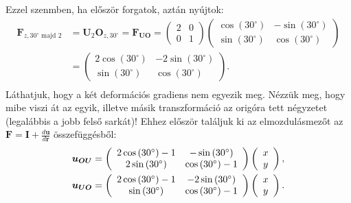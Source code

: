 \documentclass[12pt,a4paper]{scrartcl}
\let\mathbf\bm
\begin{document}
Ezzel szenmben, ha először forgatok, aztán nyújtok:
\[\begin{aligned}
  {{\mathbf{F}}_{z,30^\circ {\text{ majd 2}}}} &  = {{\mathbf{U}}_2}{{\mathbf{O}}_{z,30^\circ }} = {{\mathbf{F}}_{{\mathbf{UO}}}} = \left( {\begin{array}{*{20}{c}}
  2&0 \\ 
  0&1 
\end{array}} \right)\left( {\begin{array}{*{20}{c}}
  {\cos \left( {30^\circ } \right)}&{ - \sin \left( {30^\circ } \right)} \\ 
  {\sin \left( {30^\circ } \right)}&{\cos \left( {30^\circ } \right)} 
\end{array}} \right) \\ 
   &  = \left( {\begin{array}{*{20}{c}}
  {2\cos \left( {30^\circ } \right)}&{ - 2\sin \left( {30^\circ } \right)} \\ 
  {\sin \left( {30^\circ } \right)}&{\cos \left( {30^\circ } \right)} 
\end{array}} \right). \\ 
\end{aligned} \]
Láthatjuk, hogy a két deformációs gradiens nem egyezik meg. Nézzük meg, hogy mibe viszi át az egyik, illetve másik transzformáció az  origóra tett négyzetet (legalábbis a jobb felső sarkát)! Ehhez először találjuk ki az elmozdulásmezőt az ${\mathbf{F}} = {\mathbf{I}} + \frac{{d{\mathbf{u}}}}{{d{\mathbf{r}}}}$ összefüggésből:
 \[\begin{gathered}
  {{\mathbf{u}}_{{\mathbf{OU}}}} = \left( {\begin{array}{*{20}{c}}
  {2\cos \left( {30^\circ } \right) - 1}&{ - \sin \left( {30^\circ } \right)} \\ 
  {2\sin \left( {30^\circ } \right)}&{\cos \left( {30^\circ } \right) - 1} 
\end{array}} \right)\left( {\begin{array}{*{20}{c}}
  x \\ 
  y 
\end{array}} \right), \hfill \\
  {{\mathbf{u}}_{{\mathbf{UO}}}} = \left( {\begin{array}{*{20}{c}}
  {2\cos \left( {30^\circ } \right) - 1}&{ - 2\sin \left( {30^\circ } \right)} \\ 
  {\sin \left( {30^\circ } \right)}&{\cos \left( {30^\circ } \right) - 1} 
\end{array}} \right)\left( {\begin{array}{*{20}{c}}
  x \\ 
  y 
\end{array}} \right). \hfill \\ 
\end{gathered} \]
\end{document}
